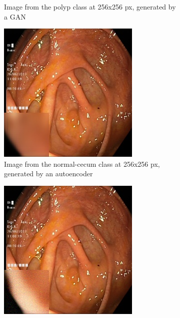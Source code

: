 \begin{figure}
\begin{subfigure}[t]{0.4\textwidth}
            \caption{Image from the polyp class at 256x256 px, generated by a GAN}    
            \label{fig:polyp_GAN_SQUARE2}
        \end{subfigure}
        \qquad\vfill%
        \begin{subfigure}[t]{0.4\textwidth}   
            \centering 
            \includegraphics[width=\textwidth]{experiments/figures/greensquare/ncAE.jpg}
            \caption{Image from the normal-cecum class at 256x256 px, generated by an autoencoder}   
            \label{fig:nc_AE_SQUARE2}
        \end{subfigure}
        \qquad%
        \begin{subfigure}[t]{0.4\textwidth}   
            \centering 
            \includegraphics[width=\textwidth]{experiments/figures/greensquare/ncGAN.jpg}

\end{subfigure}
\end{figure}
